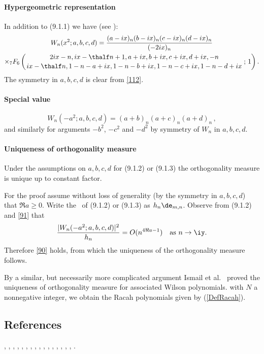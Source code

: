 \documentclass[envcountchap,graybox]{svmono}
\newcounter{rom}
\newcommand{\hyp}[5]{\mbox{}_{#1}{F}_{#2}
\left(\genfrac{}{}{0pt}{}{#3}{#4}\,;\,#5\right)}
\begin{document}
\paragraph{Hypergeometric representation}
In addition to (9.1.1) we have (see ):
\begin{multline}
W_n(x^2;a,b,c,d)
=\frac{(a-ix)_n (b-ix)_n (c-ix)_n (d-ix)_n}{(-2ix)_n}\\
\times\hyp76{2ix-n,ix-\thalf n+1,a+ix,b+ix,c+ix,d+ix,-n}
{ix-\thalf n,1-n-a+ix,1-n-b+ix,1-n-c+ix,1-n-d+ix}1.
\label{112}
\end{multline}
The symmetry in $a,b,c,d$ is clear from \eqref{112}.
%
\paragraph{Special value}
\begin{equation}
W_n(-a^2;a,b,c,d)=(a+b)_n(a+c)_n(a+d)_n\,,
\label{91}
\end{equation}
and similarly for arguments $-b^2$, $-c^2$ and
$-d^2$ by symmetry of $W_n$ in $a,b,c,d$.
%
\paragraph{Uniqueness of orthogonality measure}
Under the assumptions on $a,b,c,d$ for (9.1.2) or (9.1.3) the orthogonality
measure is unique up to constant factor.

For the proof assume without
loss of generality (by the symmetry in $a,b,c,d$) that $\Re a\ge0$.
Write the \RHS\ of (9.1.2) or (9.1.3) as $h_n\de_{m,n}$.
Observe from (9.1.2) and \eqref{91} that
\[
\frac{|W_n(-a^2;a,b,c,d)|^2}{h_n} = O(n^{4\Re a-1})\quad\hbox{as $n\to\iy$.}
\]
Therefore \eqref{90} holds, from which the uniqueness of the orthogonality
measure follows.

By a similar, but necessarily more complicated argument Ismail et al.\
 proved the uniqueness of orthogonality measure for
associated Wilson polynomials.
with $N$ a nonnegative integer, we obtain the Racah polynomials given by (\ref{DefRacah}).

\subsection*{References}
\cite{Askey89I}, \cite{AskeyWilson82}, \cite{AskeyWilson85}, \cite{AtakRahmanSuslov},
\cite{Ismail2005II}, \cite{IsmailLetMasVal}, \cite{IsmailLetValWimp90},
\cite{IsmailLetValWimp91}, \cite{Koorn85}, \cite{Koorn88}, \cite{LeskyWaibel},
\cite{Masson91}, \cite{Miller87}, \cite{MimachiII}, \cite{ValentAssche}, \cite{Wilson80}, 
\cite{Wilson91}.
\end{document}
